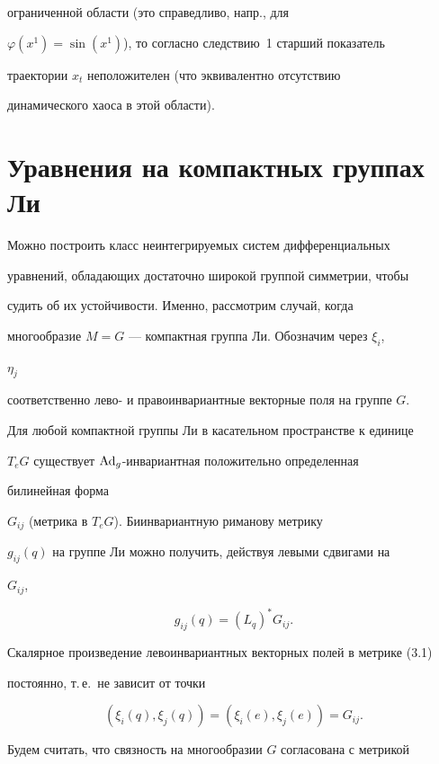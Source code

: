 ограниченной области (это справедливо, напр., для 


$\varphi(x^1)=\sin(x^1)$), то согласно следствию~1 старший показатель 


траектории $x_t$ неположителен (что эквивалентно отсутствию 


динамического хаоса в этой области). 


 


\section{Уравнения на компактных группах Ли} 


 


Можно построить класс неинтегрируемых систем дифференциальных 


уравнений, обладающих достаточно широкой группой симметрии, чтобы 


судить об их устойчивости. Именно, рассмотрим случай, когда 


многообразие $M=G$ --- компактная группа Ли. Обозначим через $\xi_i$, 


$\eta_j$ 


соответственно лево- и правоинвариантные векторные поля на группе $G$. 


Для любой компактной группы Ли в касательном пространстве к единице 


$T_e G$ существует $\operatorname{Ad}_g$-инвариантная положительно определенная 


билинейная форма 


$G_{ij}$ (метрика в $T_e G$). Биинвариантную риманову метрику 


$g_{ij}(q)$ на группе Ли можно получить, действуя левыми сдвигами на 


$G_{ij}$,


\begin{equation} 


g_{ij}(q)=(L_q)^* G_{ij}. 


\end{equation} 


Скалярное произведение левоинвариантных векторных полей в метрике (3.1) 


постоянно, т.\,е.~не зависит от точки 


$$ 


(\xi_i(q),\xi_j(q))=(\xi_i(e),\xi_j(e))=G_{ij}. 


$$ 


Будем считать, что связность на многообразии $G$ согласована с метрикой 


